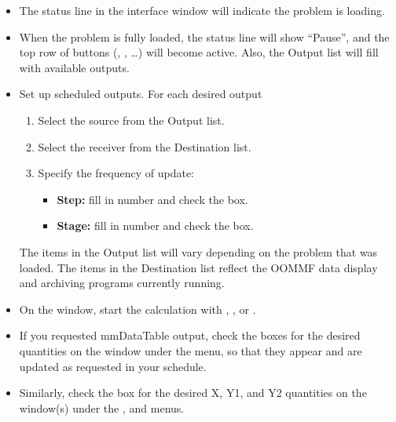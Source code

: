 \begin{list}{}{\setlength{\labelwidth}{0pt}
               \setlength{\leftmargin}{0pt}
               \setlength{\rightmargin}{\leftmargin}
               \setlength{\itemsep}{0pt}}
\begin{description}
\begin{itemize}
      \item The status line in the  interface window will
        indicate the problem is loading. 
      \item When the problem is fully loaded, the status line will
        show ``Pause'', and the top row of buttons (,
        , \ldots) will become active.  Also, the
        Output list will fill with available outputs.
      \item Set up scheduled outputs.  For each desired output
      \begin{enumerate}
         \item Select the source from the Output list.
         \item Select the receiver from the Destination list.
         \item Specify the frequency of update:
         \begin{itemize}
            \item {\bf Step:} fill in number and check the box.
            \item {\bf Stage:} fill in number and check the box.
         \end{itemize}
      \end{enumerate}
      The items in the Output list will vary depending on the
      problem that was loaded.  The items in the Destination list
      reflect the OOMMF data display and archiving programs currently
      running.
    \end{itemize}
    \item[Start calculation:]\blankspace
    \begin{itemize}
       \item On the  window, start the calculation with
         , , or
         .
       \item If you requested mmDataTable output, check the boxes for the
         desired quantities on the
          window under
         the  menu, so that they appear and are updated as
         requested in your schedule.
       \item Similarly, check the box for the desired X, Y1, and Y2
         quantities on the 
         window(s) under the ,  and  menus.
    \end{itemize}
    \item[Save results:]\blankspace

\end{description}
\end{list}

